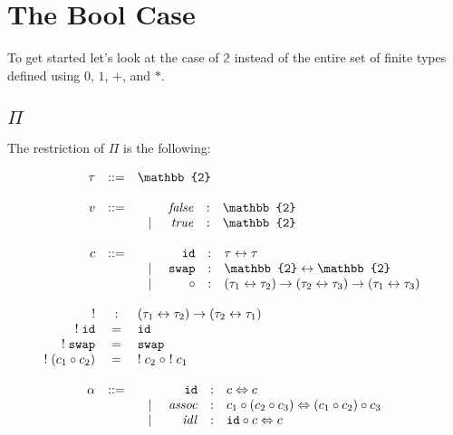\documentclass[format=acmlarge,review,natbib]{acmart}
\newcommand{\swap}{\texttt{swap}}
\newcommand{\id}{\texttt{id}}
\newcommand{\compc}[2]{#1 \circ #2}
\newcommand{\alt}{~\mid~}
\newcommand{\invc}[1]{!\;#1}
\newcommand{\assocc}{\mathit{assoc}}
\newcommand{\idlc}{\mathit{idl}}
\newcommand{\iso}{\leftrightarrow}
\newcommand{\isotwo}{\Leftrightarrow}
\newcommand{\fc}{\mathit{false}}
\newcommand{\tc}{\mathit{true}}
\begin{document}
\section{The Bool Case}

To get started let's look at the case of $\mathbb{2}$ instead of the entire set of finite types defined using $0$, $1$, $+$, and $*$.

\subsection{$\Pi$}

The restriction of $\Pi$ is the following:

\[\begin{array}{rcl}
\tau &::=& \mathbb{2} \\
\\
v &::=& \begin{array}[t]{lrcl}
                    & \fc &:& \mathbb{2} \\
              \alt & \tc &:& \mathbb{2}
               \end{array} \\
\\
c &::=& \begin{array}[t]{lrcl}
              & \id &:& \tau \iso \tau \\
               \alt & \swap &:& \mathbb{2} \iso \mathbb{2} \\
               \alt & \circ &:& (\tau_1 \iso \tau_2) \to (\tau_2 \iso \tau_3)
                              \to (\tau_1 \iso \tau_3)
               \end{array} \\
\\
! &:& (\tau_1 \iso \tau_2) \to (\tau_2 \iso \tau_1) \\
\invc{\id} &=& \id \\
\invc{\swap} &=& \swap \\
\invc{(\compc{c_1}{c_2})} &=& \compc{\invc{c_2}\;}{\;\invc{c_1}} \\
\\
\alpha &::=& \begin{array}[t]{lrcl}
               & \id &:& c \isotwo c \\
               \alt & \assocc &:& \compc{c_1}{(\compc{c_2}{c_3})} \isotwo
                                              \compc{(\compc{c_1}{c_2})}{c_3} \\
               \alt & \idlc &:& \compc{\id}{c} \isotwo c \\

\end{array}
\end{array}\]
\end{document}
